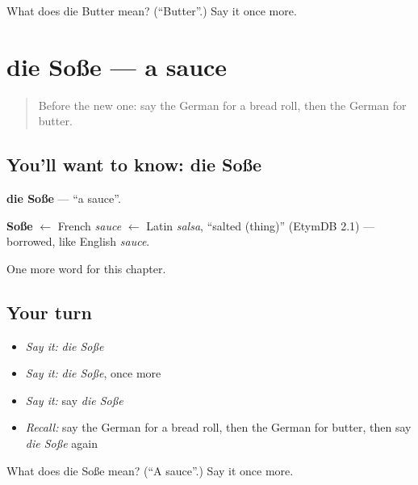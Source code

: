 \begin{tcolorbox}[breakable,colback=teal!4,colframe=teal!35!black,title={Before you move on}]
What does die Butter mean? (\textquotedblleft{}Butter\textquotedblright{}.) Say it once more.
\end{tcolorbox}
\section[die Soße]{die Soße — a sauce}

\label{lesson:GE-C123-sosse}



\begin{quote}
Before the new one: say the German for a bread roll, then the German for butter.
\end{quote}

\subsection*{You'll want to know: die Soße}
\textbf{die Soße} — \textquotedblleft{}a sauce\textquotedblright{}.

\begin{cousinweb}
\textbf{Soße} $\leftarrow$ French \emph{sauce} $\leftarrow$ Latin \emph{salsa}, \textquotedblleft{}salted (thing)\textquotedblright{} (EtymDB 2.1) — borrowed, like English \emph{sauce}.
\end{cousinweb}

\begin{grammarlens}[title={What you've built}]
One more word for this chapter.
\end{grammarlens}

\subsection*{Your turn}
\begin{itemize}
\raggedright
  \item \emph{Say it:} \emph{die Soße}
  \item \emph{Say it:} \emph{die Soße}, once more
  \item \emph{Say it:} say \emph{die Soße}
  \item \emph{Recall:} say the German for a bread roll, then the German for butter, then say \emph{die Soße} again
\end{itemize}

\begin{tcolorbox}[breakable,colback=teal!4,colframe=teal!35!black,title={Before you move on}]
What does die Soße mean? (\textquotedblleft{}A sauce\textquotedblright{}.) Say it once more.
\end{tcolorbox}
